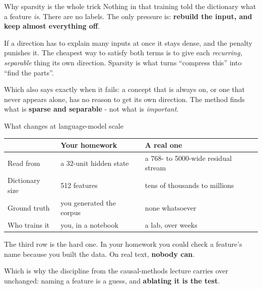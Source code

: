 \documentclass[aspectratio=169]{beamer}
\newcommand{\keybox}[1]{%
  \begin{tcolorbox}[colback=armblue!8, colframe=armblue, boxrule=0.6pt, arc=2pt]
  #1
  \end{tcolorbox}}
\newcommand{\takebox}[1]{%
  \begin{tcolorbox}[colback=paramgreen!8, colframe=paramgreen, boxrule=0.6pt, arc=2pt]
  #1
  \end{tcolorbox}}
\newcommand{\watchbox}[1]{%
  \begin{tcolorbox}[colback=armorange!12, colframe=armorange, boxrule=0.6pt, arc=2pt]
  #1
  \end{tcolorbox}}
\begin{document}
\begin{frame}{Why sparsity is the whole trick}
  \vspace{0.6em}
  Nothing in that training told the dictionary what a feature \emph{is}. There are no labels. The
  only pressure is: \textbf{rebuild the input, and keep almost everything off}.

  \vspace{0.9em}
  \keybox{If a direction has to explain many inputs at once it stays dense, and the penalty
  punishes it. The cheapest way to satisfy both terms is to give each \emph{recurring, separable}
  thing its own direction. Sparsity is what turns ``compress this'' into ``find the parts''.}

  \vspace{0.9em}
  \watchbox{Which also says exactly when it fails: a concept that is always on, or one that never
  appears alone, has no reason to get its own direction. The method finds what is
  \textbf{sparse and separable} - not what is \emph{important}.}
\end{frame}

\begin{frame}{What changes at language-model scale}
  \vspace{0.6em}
  \begin{center}
  \small
  \begin{tabular}{@{}lll@{}}
    \toprule
    & \textbf{Your homework} & \textbf{A real one}\\
    \midrule
    Read from & a 32-unit hidden state & a 768- to 5000-wide residual stream\\[0.4em]
    Dictionary size & 512 features & tens of thousands to millions\\[0.4em]
    Ground truth & you generated the corpus & none whatsoever\\[0.4em]
    Who trains it & you, in a notebook & a lab, over weeks\\
    \bottomrule
  \end{tabular}
  \end{center}

  \vspace{0.8em}
  The third row is the hard one. In your homework you could check a feature's name because you
  built the data. On real text, \textbf{nobody can}.

  \vspace{0.8em}
  \takebox{Which is why the discipline from the causal-methods lecture carries over unchanged: naming a feature is
  a guess, and \textbf{ablating it is the test}.}
\end{frame}
\end{document}
